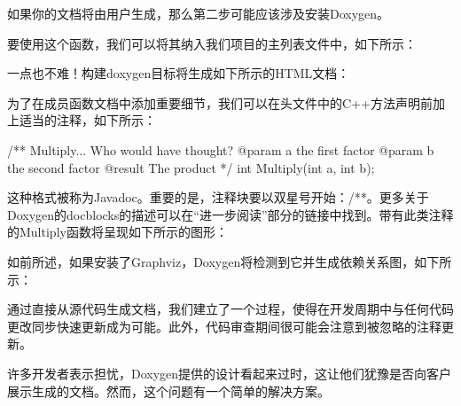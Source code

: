 如果你的文档将由用户生成，那么第二步可能应该涉及安装Doxygen。

要使用这个函数，我们可以将其纳入我们项目的主列表文件中，如下所示：



一点也不难！构建doxygen目标将生成如下所示的HTML文档：


为了在成员函数文档中添加重要细节，我们可以在头文件中的C++方法声明前加上适当的注释，如下所示：


\begin{cpp}
/**
    Multiply... Who would have thought?
    @param a the first factor
    @param b the second factor
    @result The product
*/
int Multiply(int a, int b);
\end{cpp}

这种格式被称为Javadoc。重要的是，注释块要以双星号开始：/**。更多关于Doxygen的docblocks的描述可以在“进一步阅读”部分的链接中找到。带有此类注释的Multiply函数将呈现如下所示的图形：


如前所述，如果安装了Graphviz，Doxygen将检测到它并生成依赖关系图，如下所示：


通过直接从源代码生成文档，我们建立了一个过程，使得在开发周期中与任何代码更改同步快速更新成为可能。此外，代码审查期间很可能会注意到被忽略的注释更新。

许多开发者表示担忧，Doxygen提供的设计看起来过时，这让他们犹豫是否向客户展示生成的文档。然而，这个问题有一个简单的解决方案。



















































